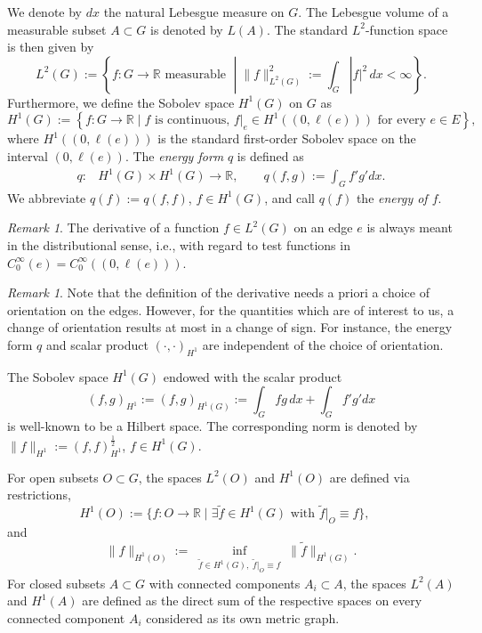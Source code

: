 \documentclass[reqno]{amsart}
\theoremstyle{plain}
\theoremstyle{definition}
\theoremstyle{remark}
\newtheorem{rmk}[thm]{Remark}
\numberwithin{equation}{section}
\newcommand{\R}{\mathbb{R}}     %
\begin{document}
We denote by $dx$ the natural Lebesgue measure on $G$. The Lebesgue volume of a measurable subset $A\subset G$ is denoted by $L(A)$. The standard $L^2$-function space is then given by
		\[
		L^2(G):= \left\{ f\colon G\to \R \text{ measurable } \; | \; \|f\|^2_{L^2(G)} := \int_{G}|f|^2 \, dx < \infty \right\}.
		\]
		Furthermore, we define the Sobolev space $H^1(G)$ on $G$ as
		\[
		H^1(G) := \left\{ f\colon G\to \R \; | \; f \text{ is continuous, } \left.f\right|_{e} \in H^1((0,\ell(e)))  \text{ for every }e \in E \right\},
		\]
		where $H^1((0,\ell(e)))$ is the standard first-order Sobolev space on the interval $(0, \ell(e))$. The \emph{energy form} $q$ is defined as
		\begin{align*}	
			q\colon& H^1(G) \times H^1(G) \to \R, \qquad q(f,g) := \int_{G} f'g' d x.
		\end{align*}
		We abbreviate $q(f) := q(f,f)$, $f \in H^1(G)$, and call $q(f)$ the {\em energy of $f$}.
		
		\begin{rmk}
			The derivative of a function $f \in L^2(G)$ on an edge $e$ is always meant in the distributional sense, i.e., with regard to test functions in $C^\infty_0(e) = C^\infty_0((0, \ell(e)))$. 
		\end{rmk}
		\begin{rmk}
			Note that the definition of the derivative needs a priori a choice of orientation on the edges. However, for the quantities which are of interest to us, a change of orientation results at most in a change of sign. For instance, the energy form $q$ and scalar product $(\cdot , \cdot)_{H^1}$ are independent of the choice of orientation. 
		\end{rmk}
		The Sobolev space $H^1(G)$ endowed with the scalar product 
		\[
		 (f,g)_{H^1} := (f,g)_{H^1(G)} :=  \int_G fg \, d x + \int_{G} f'g' d x
		\]
		is well-known to be a Hilbert space. The corresponding norm is denoted by $\|f \|_{H^1} := (f,f)_{H^1}^\frac{1}{2}$, $f \in H^1(G)$.
				
				
				
For open subsets $O \subset G$, the spaces $L^2(O)$ and $H^1(O)$ are defined via restrictions,
\[
				H^1(O) := \{f \colon O \to \R  \; | \; \exists \widetilde{f} \in H^1(G)\text{ with } \widetilde{f} \big|_{O} \equiv f\}, \quad
\]
and
\[
\|f\|_{H^1(O)} := \inf_{\substack{\widetilde{f} \in H^1(G), \; \widetilde{f} \big|_{O} \equiv f}} \|\widetilde{f} \|_{H^1(G)}.
\]
For closed subsets $A \subset G$ with connected components $A_i \subset A$, the spaces $L^2(A)$ and $H^1(A)$ are defined as the direct sum of the respective spaces on every connected component $A_i$ considered as its own metric graph.
\end{document}
